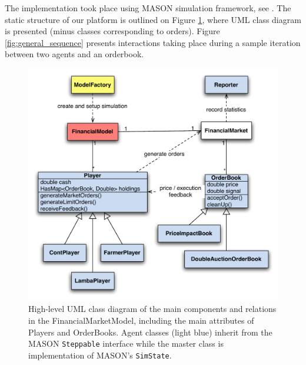 \documentclass[runningheads]{llncs}
\begin{document}
The implementation took place using MASON simulation framework, see \cite{luke2005}. The static structure of our platform is outlined on Figure \ref{fig:general_class}, where UML class diagram is presented (minus classes corresponding to orders). Figure \ref{fig:general_sequence} presents interactions taking place during a sample iteration between two agents and an orderbook.  

\begin{figure}[htb]
\centering
\includegraphics[width=1.0\textwidth]{../graphics/masterClassDiagram.pdf}
\caption{High-level UML class diagram of the main components and relations in the FinancialMarketModel, including the main attributes of Players and OrderBooks. Agent classes (light blue) inherit from the MASON \texttt{Steppable} interface while the master class is implementation of MASON's \texttt{SimState}.}
\label{fig:general_class}
\end{figure}
\end{document}
